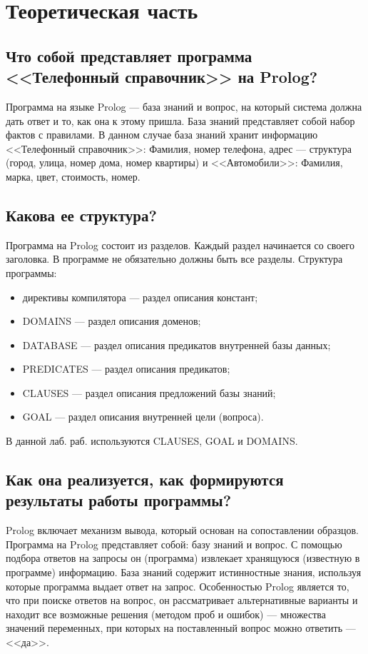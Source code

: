 \chapter{Теоретическая часть}

\section*{Что собой представляет программа <<Телефонный справочник>> на Prolog?}

Программа на языке Prolog --- база знаний и вопрос, на который система должна дать ответ и то, как она к этому пришла.
База знаний представляет собой набор фактов с правилами.
В данном  случае база знаний хранит информацию <<Телефонный справочник>>: Фамилия, номер телефона, адрес --- структура (город, улица, номер дома, номер квартиры) и <<Автомобили>>: Фамилия, марка, цвет, стоимость, номер.

\section*{Какова ее структура?}

Программа на Prolog состоит из разделов. Каждый раздел начинается со своего заголовка. 
В программе не обязательно должны быть все разделы.
Структура программы:
\begin{itemize}
	\item директивы компилятора --- раздел описания констант;
	\item DOMAINS --- раздел описания доменов;
	\item DATABASE --- раздел описания предикатов внутренней базы данных;
	\item PREDICATES --- раздел описания предикатов;
	\item CLAUSES --- раздел описания предложений базы знаний;
	\item GOAL ---  раздел описания внутренней цели (вопроса).
\end{itemize}

В данной лаб. раб. используются CLAUSES, GOAL и DOMAINS.

\section*{Как она реализуется, как формируются результаты работы программы?}

Prolog включает механизм вывода, который основан на сопоставлении образцов.
Программа на Prolog представляет собой: базу знаний и вопрос. С помощью подбора ответов
на запросы он (программа) извлекает хранящуюся (известную в программе) информацию.
База знаний содержит истинностные знания, используя которые программа выдает ответ на
запрос. Особенностью Prolog является то, что при поиске ответов на вопрос, он
рассматривает альтернативные варианты и находит все возможные решения (методом проб и
ошибок) --- множества значений переменных, при которых на поставленный вопрос можно
ответить --- <<да>>.
